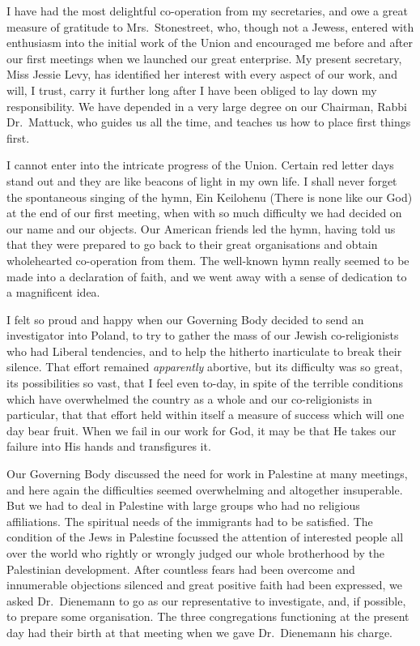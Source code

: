 I have had the most delightful co-operation from
my secretaries, and owe a great measure of gratitude to
Mrs.\ Stonestreet, who, though not a Jewess, entered with
enthusiasm into the initial work of the Union and
encouraged me before and after our first meetings when
we launched our great enterprise. My present secretary,
Miss Jessie Levy, has identified her interest with every
aspect of our work, and will, I trust, carry it further
long after I have been obliged to lay down my responsibility.
We have depended in a very large degree on our
Chairman, Rabbi Dr.\ Mattuck, who guides us all the time,
and teaches us how to place first things first.

I cannot enter into the intricate progress of the
Union. Certain red letter days stand out and they are
like beacons of light in my own life. I shall never forget
the spontaneous singing of the hymn, Ein Keilohenu
(There is none like our God) at the end of our first meeting,
when with so much difficulty we had decided on our
name and our objects. Our American friends led the
hymn, having told us that they were prepared to go back
to their great organisations and obtain wholehearted
co-operation from them. The well-known hymn really
seemed to be made into a declaration of faith, and we
went away with a sense of dedication to a magnificent
idea.

I felt so proud and happy when our Governing Body
decided to send an investigator into Poland, to try to gather
the mass of our Jewish co-religionists who had Liberal tendencies,
and to help the hitherto inarticulate to break their
silence. That effort remained \textsl{apparently} abortive, but its
difficulty was so great, its possibilities so vast, that I feel
even to-day, in spite of the terrible conditions which have
overwhelmed the country as a whole and our co-religionists
in particular, that that effort held within itself a
measure of success which will one day bear fruit. When
we fail in our work for God, it may be that He takes our
failure into His hands and transfigures it.

Our Governing Body discussed the need for work in
Palestine at many meetings, and here again the difficulties
seemed overwhelming and altogether insuperable.
But we had to deal in Palestine with large groups who
had no religious affiliations. The spiritual needs of the
immigrants had to be satisfied. The condition of the Jews
in Palestine focussed the attention of interested people
all over the world who rightly or wrongly judged our
whole brotherhood by the Palestinian development.
After countless fears had been overcome and innumerable
objections silenced and great positive faith had been
expressed, we asked Dr.\ Dienemann to go as our representative
to investigate, and, if possible, to prepare some
organisation. The three congregations functioning at
the present day had their birth at that meeting when we
gave Dr.\ Dienemann his charge.

